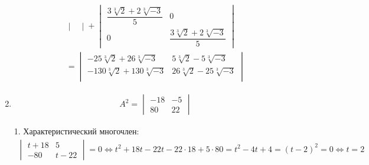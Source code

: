 \begin{enumerate}
\begin{gather*}
\begin{vmatrix}
					\end{vmatrix}
					+
					\begin{vmatrix} 
						\dfrac{3\sqrt[3]{2} + 2\sqrt[3]{-3}}{5} & 0\\
						0 & \dfrac{3\sqrt[3]{2} + 2\sqrt[3]{-3}}{5}
					\end{vmatrix}
					\\
					=
					\begin{vmatrix}
						-25 \sqrt[3]{2} + 26 \sqrt[3]{-3} & 5\sqrt[3]{2} - 5\sqrt[3]{-3}\\
						-130 \sqrt[3]{2} + 130 \sqrt[3]{-3} & 26 \sqrt[3]{2} - 25\sqrt[3]{-3}\\
					\end{vmatrix}
				\end{gather*}
				
			\item
				\begin{gather*}
					A^{2} =
					\begin{vmatrix}
						-18 & -5\\
						80 & 22
					\end{vmatrix} 
				\end{gather*}
				
				1. Характеристический многочлен:
				\begin{gather*}
					\begin{vmatrix}
						t + 18 & 5\\
						-80 & t - 22
					\end{vmatrix}
					= 0 \Leftrightarrow
					t^{2} + 18t - 22t - 22 \cdot 18 + 5 \cdot 80 = t^{2} - 4t + 4 = (t - 2)^{2} = 0 \Leftrightarrow
					t = 2
				\end{gather*}
				

\end{enumerate}
